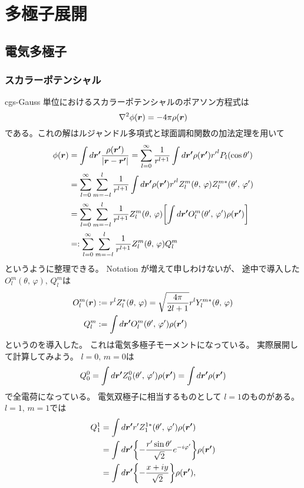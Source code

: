 \documentclass[../../master.tex]{subfiles}
\begin{document}
\chapter{多極子展開}
\section{電気多極子}
\subsection{スカラーポテンシャル}
cgs-Gauss 単位におけるスカラーポテンシャルのポアソン方程式は
\begin{equation}
    \laplacian \phi(\vb*{r}) = -4\pi\rho(\vb*{r})
\end{equation}
である。これの解はルジャンドル多項式と球面調和関数の加法定理を用いて
\begin{align}
    \phi(\vb*{r})
    &= \int d\vb*{r'} \frac{\rho(\vb*{r'})}{\abs{\vb*{r}-\vb*{r'}}}
    = \sum_{l=0}^{\infty} \frac{1}{r^{l+1}} \int d\vb*{r'} \rho(\vb*{r'}) {r'}^{l} P_l(\cos\theta')\\
    &= \sum_{l=0}^{\infty} \sum_{m=-l}^{l} \frac{1}{r^{l+1}}\int d\vb*{r'} \rho(\vb*{r'}){r'}^l Z_l^m(\theta,\,\varphi) Z_l^{m*} (\theta',\,\varphi')\\
    &= \sum_{l=0}^{\infty} \sum_{m=-l}^{l} \frac{1}{r^{l+1}}Z_l^m(\theta,\,\varphi) \qty[\int d\vb*{r'} O_l^{m} (\theta',\,\varphi')\rho(\vb*{r'})]\\
    &=:\sum_{l=0}^{\infty} \sum_{m=-l}^{l} \frac{1}{r^{l+1}}Z_l^m(\theta,\,\varphi) Q_l^m
\end{align}
というように整理できる。
Notation が増えて申しわけないが、
途中で導入した\(O_l^m(\theta,\,\varphi),\,Q_l^m\)は
\begin{align}
    O_l^m(\vb*{r}) &:= r^l Z_l^{*}(\theta,\,\varphi) = \sqrt{\frac{4\pi}{2l+1}}r^lY_l^{m*}(\theta,\,\varphi)\\
    Q_l^m &:= \int d\vb*{r'} O_l^{m} (\theta',\,\varphi') \rho(\vb*{r'})
\end{align}
というのを導入した。
これは電気多極子モーメントになっている。
実際展開して計算してみよう。
\(l=0,\,m=0\)は
\begin{align}
    Q_0^0
    = \int d\vb*{r'}  Z_0^0 (\theta',\,\varphi') \rho(\vb*{r'})
    = \int d\vb*{r'} \rho(\vb*{r'})
\end{align}
で全電荷になっている。
電気双極子に相当するものとして
\(l=1\)のものがある。
\(l=1,\,m = 1\)では
\begin{align}
    Q_1^{ 1}
    &= \int d\vb*{r'}  r' Z_1^{1*} (\theta',\,\varphi') \rho(\vb*{r'})\\
    &= \int d\vb*{r'} \qty{- \frac{r'\sin\theta'}{\sqrt{2}}e^{- i\varphi'}} \rho(\vb*{r'})\\
    &= \int d\vb*{r'} \qty{- \frac{x+iy}{\sqrt{2}}} \rho(\vb*{r'}),
\end{align}
\end{document}
